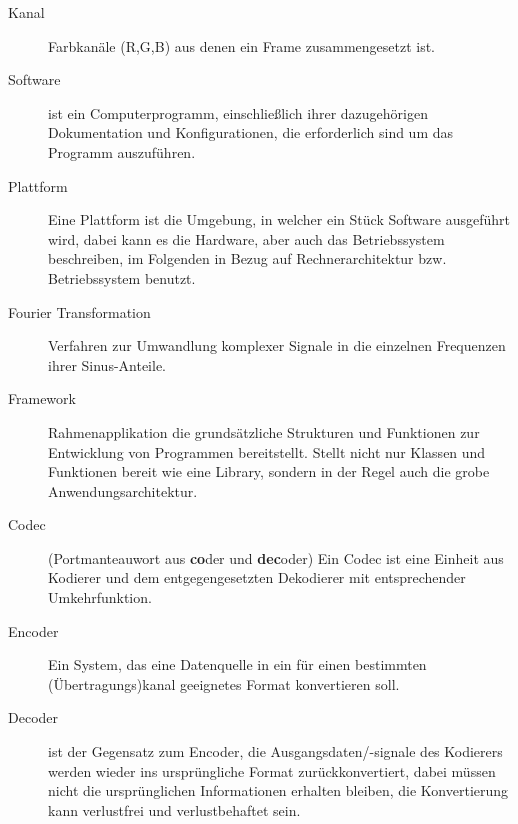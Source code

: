 \begin{description}
\item [Kanal] Farbkanäle (R,G,B) aus denen ein Frame zusammengesetzt ist.
\item [Software] ist ein Computerprogramm, einschließlich ihrer dazugehörigen Dokumentation und Konfigurationen, die erforderlich sind um das Programm auszuführen.
\item [Plattform] Eine Plattform ist die Umgebung, in welcher ein Stück Software ausgeführt wird, dabei kann es die Hardware, aber auch das Betriebssystem beschreiben, im Folgenden in Bezug auf Rechnerarchitektur bzw. Betriebssystem benutzt. \cite{plat_def}
\item [Fourier Transformation] Verfahren zur Umwandlung komplexer Signale in die einzelnen Frequenzen ihrer Sinus-Anteile.
\item [Framework] Rahmenapplikation die grundsätzliche Strukturen und Funktionen zur Entwicklung von Programmen bereitstellt. Stellt nicht nur Klassen und Funktionen bereit wie eine Library, sondern in der Regel auch die grobe Anwendungsarchitektur. \cite{framework_def}
\item [Codec] (Portmanteauwort aus \textsf{\textbf{co}der} und \textsf{\textbf{dec}}oder) Ein Codec ist eine Einheit aus Kodierer und dem entgegengesetzten Dekodierer mit entsprechender Umkehrfunktion. \cite{codec_def}
\item [Encoder] Ein System, das eine Datenquelle in ein für einen bestimmten (Übertragungs)kanal geeignetes Format konvertieren soll. \cite{encoder_def}
\item [Decoder] ist der Gegensatz zum Encoder, die Ausgangsdaten/-signale des Kodierers werden wieder ins ursprüngliche Format zurückkonvertiert, dabei müssen nicht die ursprünglichen Informationen erhalten bleiben, die Konvertierung kann verlustfrei und verlustbehaftet sein. \cite{decoder_def}
\end{description}
